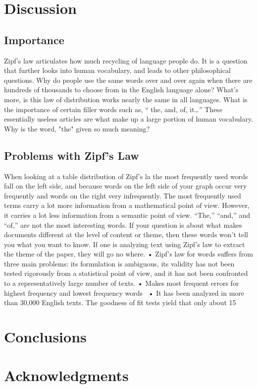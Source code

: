\documentclass[a4paper,10pt]{article}
\begin{document}
	

\section{Discussion}

\subsection{Importance}

Zipf’s law articulates how much recycling of language people do. It is a question that further looks into human vocabulary, and leads to other philosophical questions. Why do people use the same words over and over again when there are hundreds of thousands to choose from in the English language alone? What’s more, is this law of distribution works nearly the same in all languages. What is the importance of certain filler words such as, “ the, and, of, it…” These essentially useless articles are what make up a large portion of human vocabulary. Why is the word, "the" given so much meaning?


\subsection{Problems with Zipf's Law}

When looking at a table distribution of Zipf’s la the most frequently used words fall on the left side, and because words on the left side of your graph occur very frequently and words on the right very infrequently. The most frequently used terms carry a lot more information from a mathematical point of view. However, it carries a lot less information from a semantic point of view. “The,” “and,” and “of,” are not the most interesting words. If your question is about what makes documents different at the level of content or theme, then these words won’t tell you what you want to know. If one is analyzing text using Zipf’s law to extract the theme of the paper, they will go no where. 
• Zipf's law for words suffers from three main problems: its formulation is ambiguous, its validity has not been tested rigorously from a statistical point of view, and it has not been confronted to a representatively large number of texts.
• Makes most frequent errors for highest frequency and lowest frequency words 
• It has been analyzed in more than 30,000 English texts. The goodness of fit tests yield that only about 15%


\section{Conclusions}



\section*{Acknowledgments}




 
 
\end{document}
